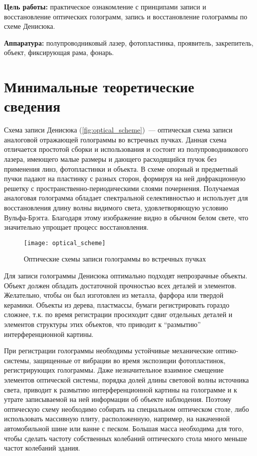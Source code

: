 \textbf{Цель работы:} практическое ознакомление с принципами записи и восстановление оптических голограмм, запись и восстановление голограммы по схеме Денисюка.

\textbf{Аппаратура:} полупроводниковый лазер, фотопластинка, проявитель, закрепитель, объект, фиксирующая рама, фонарь.

\section{Минимальные теоретические сведения}

Схема записи Денисюка (\autoref{fig:optical_scheme})~--- оптическая схема записи аналоговой отражающей голограммы во встречных пучках. Данная схема отличается простотой сборки и использования и состоит из полупроводникового лазера, имеющего малые размеры и дающего расходящийся пучок без применения линз, фотопластинки и объекта. В схеме опорный и предметный пучки падают на пластинку с разных сторон, формируя на ней дифракционную решетку с пространственно-периодическими слоями почернения. Получаемая аналоговая голограмма обладает спектральной селективностью и использует для восстановления длину волны видимого света, удовлетворяющую условию Вульфа-Брэгга. Благодаря этому изображение видно в обычном белом свете, что значительно упрощает процесс восстановления.

\begin{figure}[h]%
    \centering
    \texttt{[image: optical\_scheme]}%
    \caption[]{Оптические схемы записи голограммы во встречных пучках}%
    \label{fig:optical_scheme}%
\end{figure}

Для записи голограммы Денисюка оптимально подходят непрозрачные объекты. Объект должен обладать достаточной прочностью всех деталей и элементов. Желательно, чтобы он был изготовлен из металла, фарфора или твердой керамики. Объекты из дерева, пластмассы, бумаги регистрировать гораздо сложнее, т.к. по время регистрации просиходит сдвиг отдельных деталей и элементов структуры этих объектов, что приводит к \enquote{размытию} интерференционной картины.

При регистрации голограммы необходимы устойчивые механические оптико-системы, защищенные от вибрации во время экспозиции фотопластинок, регистрирующих голограммы. Даже незначительное взаимное смещение элементов оптической системы, порядка долей длины световой волны источника света, приводит к размытию интерференционной картины на голограмме и к утрате записываемой на ней информации об объекте наблюдения. Поэтому оптическую схему необходимо собирать на специальном оптическом столе, либо использовать массивную плиту, расположенную, например, на накаченной автомобильной шине или ванне с песком. Большая масса необходима для того, чтобы сделать частоту собственных колебаний оптического стола много меньше частот колебаний здания.


